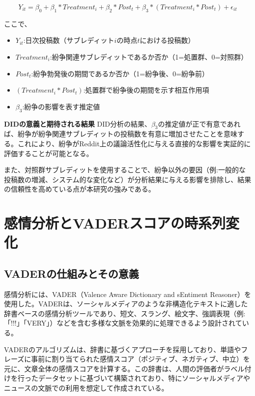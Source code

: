 \documentclass[11pt, a4j]{jreport}
\begin{document}
    \begin{equation}
        Y_{it} = \beta_{0} + \beta_{1}*Treatment_{i} + \beta_{2}*Post_{t} + \beta_{3}*(Treatment_{i} * Post_{t}) + \epsilon_{it}
    \end{equation}

    ここで、
    \begin{itemize}
        \item $Y_{it}$:日次投稿数（サブレディット$i$の時点$t$における投稿数）
        \item $Treatment_{i}$:紛争関連サブレディットであるか否か（1=処置群、0=対照群）
        \item $Post_{t}$:紛争勃発後の期間であるか否か（1=紛争後、0=紛争前）
        \item $(Treatment_{i} * Post_{t})$:処置群で紛争後の期間を示す相互作用項
        \item $\beta_{3}$:紛争の影響を表す推定値
    \end{itemize}

    \textbf{DIDの意義と期待される結果}
    DID分析の結果、$\beta_{3}$の推定値が正で有意であれば、紛争が紛争関連サブレディットの投稿数を有意に増加させたことを意味する。これにより、紛争がReddit上の議論活性化に与える直接的な影響を実証的に評価することが可能となる。

    また、対照群サブレディットを使用することで、紛争以外の要因（例:一般的な投稿数の増減、システム的な変化など）が分析結果に与える影響を排除し、結果の信頼性を高めている点が本研究の強みである。

    \section{感情分析とVADERスコアの時系列変化}

    \subsection*{VADERの仕組みとその意義}
    感情分析には、VADER（Valence Aware Dictionary and sEntiment Reasoner）を使用した。VADERは、ソーシャルメディアのような非構造化テキストに適した辞書ベースの感情分析ツールであり、短文、スラング、絵文字、強調表現（例:「!!!」「VERY」）などを含む多様な文脈を効果的に処理できるよう設計されている。

    VADERのアルゴリズムは、辞書に基づくアプローチを採用しており、単語やフレーズに事前に割り当てられた感情スコア（ポジティブ、ネガティブ、中立）を元に、文章全体の感情スコアを計算する。この辞書は、人間の評価者がラベル付けを行ったデータセットに基づいて構築されており、特にソーシャルメディアやニュースの文脈での利用を想定して作成されている。
\end{document}
